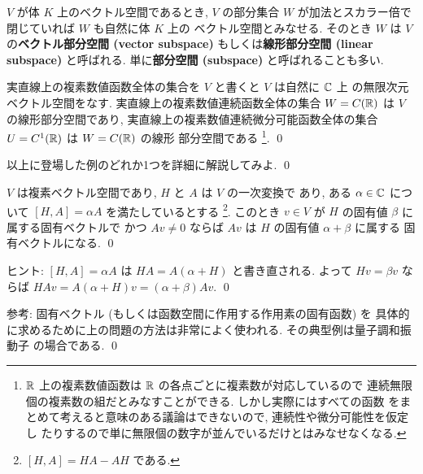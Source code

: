 \documentclass[12pt,twoside]{jarticle}
\begin{document}
\medskip

$V$ が体 $K$ 上のベクトル空間であるとき, 
$V$ の部分集合 $W$ が加法とスカラー倍で閉じていれば $W$ も自然に体 $K$ 上の
ベクトル空間とみなせる.  そのとき $W$ は $V$ の{\bf ベクトル部分空間 
(vector subspace)} もしくは{\bf 線形部分空間 (linear subspace)} と呼ばれる.
単に{\bf 部分空間 (subspace)} と呼ばれることも多い.


\begin{example}
  実直線上の複素数値函数全体の集合を $V$ と書くと $V$ は自然に ${\mathbb C}$ 上
  の無限次元ベクトル空間をなす.  
  実直線上の複素数値連続函数全体の集合 $W=C({\mathbb R})$ は $V$ の線形部分空間であり,
  実直線上の複素数値連続微分可能函数全体の集合 $U=C^1({\mathbb R})$ は $W=C({\mathbb R})$ の線形
  部分空間である%
  \footnote{${\mathbb R}$ 上の複素数値函数は ${\mathbb R}$ の各点ごとに複素数が対応しているので
    連続無限個の複素数の組だとみなすことができる.  しかし実際にはすべての函数
    をまとめて考えると意味のある議論はできないので, 連続性や微分可能性を仮定し
    たりするので単に無限個の数字が並んでいるだけとはみなせなくなる.}.
  \qed
\end{example}


\begin{question}
  以上に登場した例のどれか1つを詳細に解説してみよ. \qed
\end{question}


\begin{question}
  $V$ は複素ベクトル空間であり, $H$ と $A$ は $V$ の一次変換で
  あり, ある $\alpha\in{\mathbb C}$ について $[H,A]=\alpha A$ を満たしているとする%
  \footnote{$[H,A]=HA - AH$ である.}.
  このとき $v\in V$ が $H$ の固有値 $\beta$ に属する固有ベクトルで
  かつ $Av\ne 0$ ならば $Av$ は $H$ の固有値 $\alpha+\beta$ に属する
  固有ベクトルになる. \qed
\end{question}

\noindent
ヒント: $[H,A]=\alpha A$ は $HA = A(\alpha+H)$ と書き直される.
よって $Hv=\beta v$ ならば $HAv = A(\alpha+H)v = (\alpha+\beta)Av$.
\qed

\medskip
\noindent
参考: 固有ベクトル (もしくは函数空間に作用する作用素の固有函数) を
具体的に求めるために上の問題の方法は非常によく使われる.
その典型例は量子調和振動子  の場合である.
\qed
\end{document}
